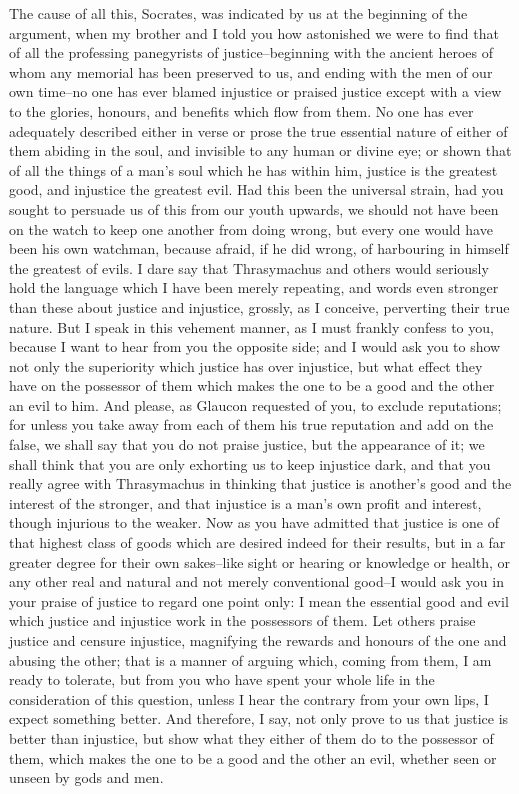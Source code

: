 The cause of all this, Socrates, was indicated by us at the beginning of
the argument, when my brother and I told you how astonished we were to
find that of all the professing panegyrists of justice--beginning with
the ancient heroes of whom any memorial has been preserved to us, and
ending with the men of our own time--no one has ever blamed injustice or
praised justice except with a view to the glories, honours, and benefits
which flow from them. No one has ever adequately described either in
verse or prose the true essential nature of either of them abiding in
the soul, and invisible to any human or divine eye; or shown that of
all the things of a man's soul which he has within him, justice is
the greatest good, and injustice the greatest evil. Had this been the
universal strain, had you sought to persuade us of this from our youth
upwards, we should not have been on the watch to keep one another from
doing wrong, but every one would have been his own watchman, because
afraid, if he did wrong, of harbouring in himself the greatest of
evils. I dare say that Thrasymachus and others would seriously hold the
language which I have been merely repeating, and words even stronger
than these about justice and injustice, grossly, as I conceive,
perverting their true nature. But I speak in this vehement manner, as
I must frankly confess to you, because I want to hear from you the
opposite side; and I would ask you to show not only the superiority
which justice has over injustice, but what effect they have on the
possessor of them which makes the one to be a good and the other an evil
to him. And please, as Glaucon requested of you, to exclude reputations;
for unless you take away from each of them his true reputation and
add on the false, we shall say that you do not praise justice, but the
appearance of it; we shall think that you are only exhorting us to keep
injustice dark, and that you really agree with Thrasymachus in thinking
that justice is another's good and the interest of the stronger, and
that injustice is a man's own profit and interest, though injurious to
the weaker. Now as you have admitted that justice is one of that highest
class of goods which are desired indeed for their results, but in a far
greater degree for their own sakes--like sight or hearing or knowledge
or health, or any other real and natural and not merely conventional
good--I would ask you in your praise of justice to regard one point
only: I mean the essential good and evil which justice and injustice
work in the possessors of them. Let others praise justice and censure
injustice, magnifying the rewards and honours of the one and abusing the
other; that is a manner of arguing which, coming from them, I am
ready to tolerate, but from you who have spent your whole life in the
consideration of this question, unless I hear the contrary from your own
lips, I expect something better. And therefore, I say, not only prove to
us that justice is better than injustice, but show what they either of
them do to the possessor of them, which makes the one to be a good and
the other an evil, whether seen or unseen by gods and men.

